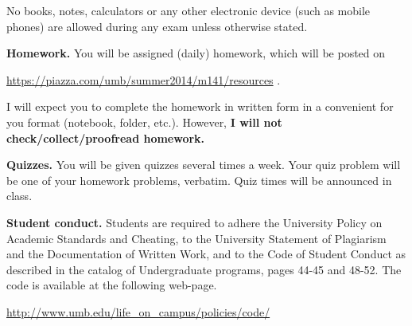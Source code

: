 \documentclass{article}
\begin{document}
No books, notes, calculators or any other electronic device (such as mobile phones) are allowed during any exam unless otherwise stated.

\medskip
\noindent \textbf{Homework.} You will be assigned (daily) homework, which will be posted on

\url{https://piazza.com/umb/summer2014/m141/resources} \quad \quad \quad .

\noindent I will expect you to complete the homework in written form in a convenient for you format (notebook, folder, etc.). However, \textbf{I will not check/collect/proofread homework.} 
 
 \medskip
\noindent \textbf{Quizzes.} You will be given quizzes several times a week. Your quiz problem will be one of your homework problems, verbatim. Quiz times will be announced in class. 



\medskip
\noindent \textbf{Student conduct.} Students  are required to adhere the University Policy on Academic Standards and Cheating, to the University Statement of Plagiarism and the Documentation of Written Work, and to the Code of Student Conduct as described in the catalog of Undergraduate programs, pages 44-45 and 48-52. The code is available at the following web-page.

\noindent\url{http://www.umb.edu/life_on_campus/policies/code/}
\end{document}
